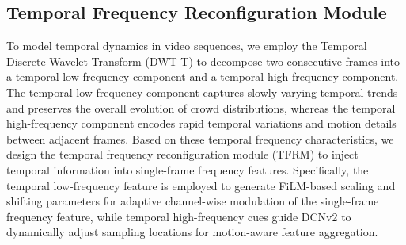 \documentclass[lettersize,journal]{IEEEtran}
\begin{document}
\vspace{-0.5em}
\subsection{ Temporal Frequency Reconfiguration Module}\label{TFRM}
To model temporal dynamics in video sequences, we employ the Temporal Discrete Wavelet Transform (DWT-T) to decompose two consecutive frames into a temporal low-frequency component and a temporal high-frequency component. The temporal low-frequency component captures slowly varying temporal trends and preserves the overall evolution of crowd distributions, whereas the temporal high-frequency component encodes rapid temporal variations and motion details between adjacent frames. Based on these temporal frequency characteristics, we design the temporal frequency reconfiguration module (TFRM) to inject temporal information into single-frame frequency features. Specifically, the temporal low-frequency feature is employed to generate FiLM-based\cite{perez2018film} scaling and shifting parameters for adaptive channel-wise modulation of the single-frame frequency feature, while temporal high-frequency cues guide DCNv2 \cite{zhu2019deformable} to dynamically adjust sampling locations for motion-aware feature aggregation.
\end{document}
